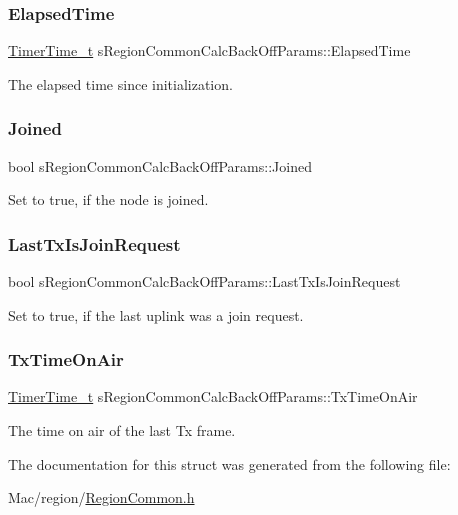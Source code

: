\subsubsection{\texorpdfstring{Elapsed\+Time}{ElapsedTime}}
{\footnotesize\ttfamily \hyperlink{utilities_8h_a4215ca43d3e953099ea758ce428599d0}{Timer\+Time\+\_\+t} s\+Region\+Common\+Calc\+Back\+Off\+Params\+::\+Elapsed\+Time}

The elapsed time since initialization. \mbox{\label{structsRegionCommonCalcBackOffParams_a744476f15b6a603ba729a942b9d6fcdc}} 
\subsubsection{\texorpdfstring{Joined}{Joined}}
{\footnotesize\ttfamily bool s\+Region\+Common\+Calc\+Back\+Off\+Params\+::\+Joined}

Set to true, if the node is joined. \mbox{\label{structsRegionCommonCalcBackOffParams_aafd7bf9a24adbed2a88aa1334e30e528}} 
\subsubsection{\texorpdfstring{Last\+Tx\+Is\+Join\+Request}{LastTxIsJoinRequest}}
{\footnotesize\ttfamily bool s\+Region\+Common\+Calc\+Back\+Off\+Params\+::\+Last\+Tx\+Is\+Join\+Request}

Set to true, if the last uplink was a join request. \mbox{\label{structsRegionCommonCalcBackOffParams_a24e06077cbe6b16d8abd08ef6327a4dc}} 
\subsubsection{\texorpdfstring{Tx\+Time\+On\+Air}{TxTimeOnAir}}
{\footnotesize\ttfamily \hyperlink{utilities_8h_a4215ca43d3e953099ea758ce428599d0}{Timer\+Time\+\_\+t} s\+Region\+Common\+Calc\+Back\+Off\+Params\+::\+Tx\+Time\+On\+Air}

The time on air of the last Tx frame. 

The documentation for this struct was generated from the following file\+:\begin{DoxyCompactItemize}
\item 
Mac/region/\hyperlink{RegionCommon_8h}{Region\+Common.\+h}\end{DoxyCompactItemize}
